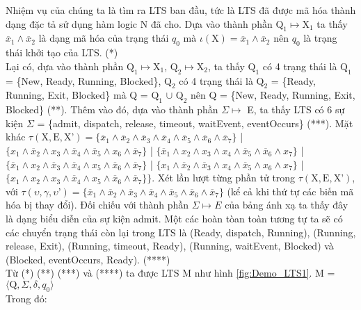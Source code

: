 \documentclass[a4paper,13pt,oneside,openany]{book}
\begin{document}
\begin{flushleft}
	Nhiệm vụ của chúng ta là tìm ra LTS ban đầu, tức là LTS đã được mã hóa thành dạng đặc tả sử dụng hàm logic N đã cho. Dựa vào thành phần $\textrm{Q}_1 \mapsto \textrm{X}_1$ ta thấy $\overline{x}_1 \land \overline{x}_2$ là dạng mã hóa của trạng thái $q_0$ mà $\iota(\textrm{X}) = \overline{x}_1 \land \overline{x}_2$ nên $q_0$ là trạng thái khởi tạo của LTS. (*)\\
	Lại có, dựa vào thành phần $\textrm{Q}_1 \mapsto \textrm{X}_1$, $\textrm{Q}_2 \mapsto \textrm{X}_2$, ta thấy $\textrm{Q}_1$ có 4 trạng thái là $\textrm{Q}_1$ = \{New, Ready, Running, Blocked\}, $\textrm{Q}_2$ có 4 trạng thái là $\textrm{Q}_2$ = \{Ready, Running, Exit, Blocked\} mà Q = $\textrm{Q}_1$ $\cup$ $\textrm{Q}_2$ nên Q = \{New, Ready, Running, Exit, Blocked\} (**). Thêm vào đó, dựa vào thành phần 
	$\Sigma \mapsto$ E, ta thấy LTS có 6 sự kiện $\Sigma$ = \{admit, dispatch, release, timeout, waitEvent, eventOccurs\} (***). Mặt khác $\tau(\textrm{X}, \textrm{E}, \textrm{X'}) = \{\overline{x}_1 \land \overline{x}_2 \land \overline{x}_3 \land \overline{x}_4 \land \overline{x}_5 \land \overline{x}_6 \land \overline{x}_7\}$ | $\{x_1 \land \overline{x}_2 \land x_3 \land \overline{x}_4 \land \overline{x}_5 \land x_6 \land \overline{x}_7\}$ | $\{\overline{x}_1 \land x_2 \land x_3 \land x_4 \land \overline{x}_5 \land \overline{x}_6 \land x_7\}$ | $\{\overline{x}_1 \land x_2 \land \overline{x}_3 \land \overline{x}_4 \land x_5 \land \overline{x}_6 \land \overline{x}_7\}$ | $\{x_1 \land \overline{x}_2 \land \overline{x}_3 \land x_4 \land \overline{x}_5 \land x_6 \land x_7\}$ | $\{x_1 \land x_2 \land x_3 \land \overline{x}_4 \land x_5 \land \overline{x}_6 \land \overline{x}_7\}\}$. Xét lần lượt từng phần tử trong $\tau(\textrm{X}, \textrm{E}, \textrm{X'})$, với $\tau(\upsilon, \gamma, \upsilon\textrm{'}) = \{\overline{x}_1 \land \overline{x}_2 \land \overline{x}_3 \land \overline{x}_4 \land \overline{x}_5 \land \overline{x}_6 \land \overline{x}_7\}$ (kể cả khi thứ tự các biến mã hóa bị thay đổi). Đối chiếu với thành phần $\Sigma \mapsto E$ của bảng ánh xạ ta thấy đây là dạng biểu diễn của sự kiện admit. Một các hoàn tòan toàn tương tự ta sẽ có các chuyển trạng thái còn lại trong LTS là (Ready, dispatch, Running), (Running, release, Exit), (Running, timeout, Ready), (Running, waitEvent, Blocked) và (Blocked, eventOccurs, Ready). (****)\\
	Từ (*) (**) (***) và (****) ta được LTS M như hình \ref{fig:Demo_LTS1}. M = $\langle\textrm{Q}, \Sigma, \delta, q_0\rangle$\\
	Trong đó:
	\begin{itemize}

\end{itemize}
\end{flushleft}
\end{document}
